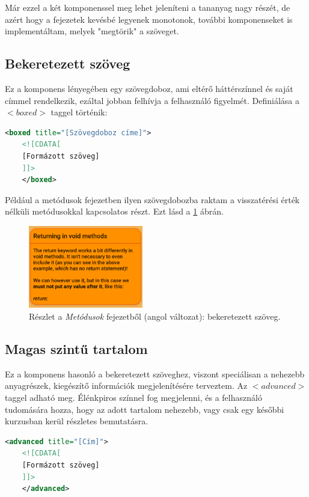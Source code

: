 \documentclass[12pt,a4paper]{article}
\begin{document}
	Már ezzel a két komponenssel meg lehet jeleníteni a tananyag nagy részét, de azért hogy a fejezetek kevésbé legyenek monotonok, további komponenseket is implementáltam, melyek "megtörik" a szöveget. 
	
	\subsection{Bekeretezett szöveg}
	
	Ez a komponens lényegében egy szövegdoboz, ami eltérő háttérszínnel és saját címmel rendelkezik, ezáltal jobban felhívja a felhasználó figyelmét. Definiálása a $<boxed>$ taggel történik:
	
	\bigskip
	\begin{lstlisting}[language=XML]
	<boxed title="[Szövegdoboz címe]">
	<![CDATA[
	[Formázott szöveg]
	]]>
	</boxed>	
	\end{lstlisting}
	\bigskip
	
	Például a metódusok fejezetben ilyen szövegdobozba raktam a visszatérési érték nélküli metódusokkal kapcsolatos részt. Ezt lásd a \ref{boxed_component_figure} ábrán.
	
	\begin{figure}[h!]
		\centering
		\includegraphics[width=5cm]{boxed_component}
		\caption{Részlet a \textit{Metódusok} fejezetből (angol változat): bekeretezett szöveg.}
		\label{boxed_component_figure}
	\end{figure}
	
	\subsection{Magas szintű tartalom}
	
	Ez a komponens hasonló a bekeretezett szöveghez, viszont speciálisan a nehezebb anyagrészek, kiegészítő információk megjelenítésére terveztem. Az $<advanced>$ taggel adható meg. Élénkpiros színnel fog megjelenni, és a felhasználó tudomására hozza, hogy az adott tartalom nehezebb, vagy csak egy későbbi kurzusban kerül részletes bemutatásra.
	
	\bigskip
	\begin{lstlisting}[language=XML]
	<advanced title="[Cím]">
	<![CDATA[
	[Formázott szöveg]
	]]>
	</advanced>	
	\end{lstlisting}
	\bigskip
	
\end{document}
